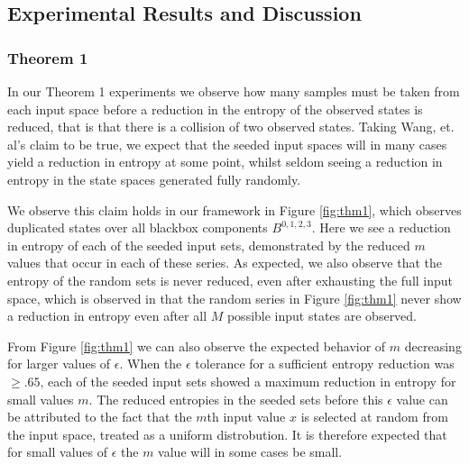 \documentclass[letterpaper,twocolumn,10pt]{article}
\begin{document}
\subsection{Experimental Results and Discussion} 

\subsubsection{Theorem 1}

In our Theorem 1 experiments we observe how many samples must be taken from each input space before a reduction in the entropy of the observed states is reduced, that is that there is a collision of two observed states. Taking Wang, et. al's claim to be true, we expect that the seeded input spaces will in many cases yield a reduction in entropy at some point, whilst seldom seeing a reduction in entropy in the state spaces generated fully randomly. 

We observe this claim holds in our framework in Figure \ref{fig:thm1}, which observes duplicated states over all blackbox components $B^{0,1,2,3}$. Here we see a reduction in entropy of each of the seeded input sets, demonstrated by the reduced $m$ values that occur in each of these series. As expected, we also observe that the entropy of the random sets is never reduced, even after exhausting the full input space, which is observed in that the random series in Figure \ref{fig:thm1} never show a reduction in entropy even after all $M$ possible input states are observed. 

From Figure \ref{fig:thm1} we can also observe the expected behavior of $m$ decreasing for larger values of $\epsilon$. When the $\epsilon$ tolerance for a sufficient entropy reduction was $\geq .65$, each of the seeded input sets showed a maximum reduction in entropy for small values $m$. The reduced entropies in the seeded sets before this $\epsilon$ value can be attributed to the fact that the $m$th input value $x$ is selected at random from the input space, treated as a uniform distrobution. It is therefore expected that for small values of $\epsilon$ the $m$ value will in some cases be small.
\end{document}
